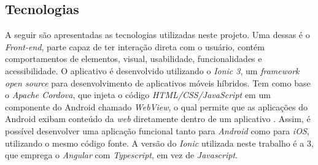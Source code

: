 \documentclass[portuguese]{textolivre}
\begin{document}
\subsection{Tecnologias}
A seguir são apresentadas as tecnologias utilizadas neste projeto. Uma dessas é o \textit{Front-end}, parte capaz de ter interação direta com o usuário, contém comportamentos de elementos, visual, usabilidade, funcionalidades e acessibilidade. O aplicativo é desenvolvido utilizando o \textit{Ionic 3}, um \textit{framework open source} para desenvolvimento de aplicativos móveis híbridos. Tem como base o \textit{Apache Cordova}, que injeta o código \textit{HTML/CSS/JavaScript} em um componente do Android chamado \textit{WebView}, o qual permite que as aplicações do Android exibam conteúdo da \textit{web} diretamente dentro de um aplicativo \cite{canaltech:2020}. Assim, é possível desenvolver uma aplicação funcional tanto para \textit{Android} como para  \textit{iOS}, utilizando o mesmo código fonte. A versão do \textit{Ionic} utilizada neste trabalho é a 3, que emprega o \textit{Angular} com \textit{Typescript}, em vez de \textit{Javascript}.
\end{document}
